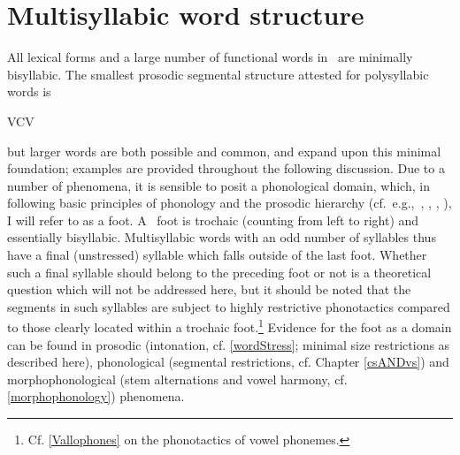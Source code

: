 \section{Multisyllabic word structure}\label{polysyllabicWords}
All lexical forms and a large number of functional words in \PS\ are minimally bisyllabic. The smallest prosodic segmental structure attested for polysyllabic words is \begin{center}VCV\end{center} but larger words are both possible and common, and expand upon this minimal foundation; examples are provided throughout the following discussion. Due to a number of phenomena, it is sensible to posit a phonological domain, which, in following basic principles of phonology %
and the prosodic hierarchy %
(cf.~e.g.,~\citealt[280-283]{dixon2010a}, \citealt{Selkirk1980}, \citealt{Hayes1989}, \citealt{NesporVogel1986}), I will refer to as a {foot}. A \PS\ foot is trochaic (counting from left to right) and essentially bisyllabic. Multisyllabic words with an odd number of syllables thus have a final (unstressed) syllable which falls outside of the last foot. 
Whether such a final syllable should belong to the preceding foot or not is a theoretical question which will not be addressed here, but it should be noted that the segments in such syllables are subject to highly restrictive phonotactics compared to those clearly located within a trochaic foot.\footnote{Cf. \SEC\ref{Vallophones} on the phonotactics of vowel phonemes.} 
Evidence for the foot as a domain can be found in prosodic (intonation, cf. \SEC\ref{wordStress}; minimal size restrictions as described here), phonological (segmental restrictions, cf. Chapter \ref{csANDvs}) and morphophonological (stem alternations and vowel harmony, cf. \SEC\ref{morphophonology}) phenomena. 



